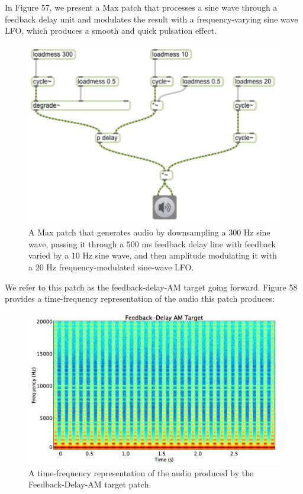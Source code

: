 \documentclass[12pt]{report} 	%
\numberwithin{figure}{chapter}
\numberwithin{table}{chapter}
\numberwithin{equation}{chapter}
\begin{document}
\begin{flushleft}
In Figure 57, we present a Max patch that processes a sine wave through a feedback delay unit and modulates the result with a frequency-varying sine wave LFO, which produces a smooth and quick pulsation effect.
\begin{figure}[h!]
\begin{center}
\includegraphics[scale=0.8]{DelayFeedbackAM}
\caption[Delay feedback AM Max patch]{A Max patch that generates audio by downsampling a $300$ Hz sine wave, passing it through a $500$ ms feedback delay line with feedback varied by a $10$ Hz sine wave, and then amplitude modulating it with a $20$ Hz frequency-modulated sine-wave LFO.}
\end{center}
\end{figure}
We refer to this patch as the feedback-delay-AM target going forward. Figure 58 provides a time-frequency representation of the audio this patch produces:
\begin{figure}[h!]
\begin{center}
\includegraphics[width=\linewidth]{FeedbackDelayAMTargetSTFT}
\caption[Delay feedback AM time-frequency representation]{A time-frequency representation of the audio produced by the Feedback-Delay-AM target patch.}
\end{center}
\end{figure}


\end{flushleft}
\end{document}
